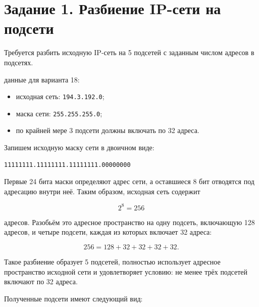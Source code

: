 \section{Задание 1. Разбиение IP-сети на подсети}

Требуется разбить исходную IP-сеть на 5 подсетей с заданным числом адресов в подсетях.

\vspace{1em}

 данные для варианта 18:

\begin{itemize}
	\item исходная сеть: \texttt{194.3.192.0};
	\item маска сети: \texttt{255.255.255.0};
	\item по крайней мере 3 подсети должны включать по 32 адреса.
\end{itemize}

Запишем исходную маску сети в двоичном виде:

\begin{verbatim}
11111111.11111111.11111111.00000000
\end{verbatim}

Первые 24 бита маски определяют адрес сети, а оставшиеся 8 бит отводятся
под адресацию внутри неё. Таким образом, исходная сеть содержит

\[
	2^8 = 256
\]

адресов. Разобьём это адресное пространство на одну подсеть, включающую
128 адресов, и четыре подсети, каждая из которых включает 32 адреса:

\[
	256 = 128 + 32 + 32 + 32 + 32.
\]

Такое разбиение образует 5 подсетей, полностью использует адресное
пространство исходной сети и удовлетворяет условию: не менее трёх подсетей
включают по 32 адреса.

Полученные подсети имеют следующий вид:

